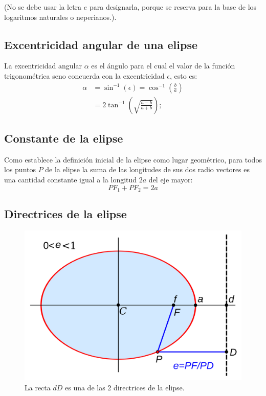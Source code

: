 \documentclass[a2,plainboxedsections]{sciposter}
\begin{document}
\begin{multicols}{3}
(No se debe usar la letra $e$ para designarla, porque se reserva para la base de los logaritmos naturales o neperianos.).

\subsection{Excentricidad angular de una elipse}

La excentricidad angular $\alpha$ es el ángulo para el cual el valor de la función trigonométrica seno concuerda con la excentricidad $\epsilon$, esto es:
\begin{align*}
\alpha&=\sin^{-1}(\epsilon)=\cos^{-1}\left(\frac{b}{a}\right)\\
&=2\tan^{-1}\left(\sqrt{\frac{a-b}{a+b}}\right);
\end{align*}

\subsection{Constante de la elipse}

Como establece la definición inicial de la elipse como lugar geométrico, para todos los puntos $P$ de la elipse la suma de las longitudes de sus dos radio vectores es una cantidad constante igual a la longitud $2a$ del eje mayor:
\[
PF_1 + PF_2 = 2a
\]

\subsection{Directrices de la elipse}

\begin{figure}
 	\includegraphics[width=\textwidth]{elipse2}
	\caption{La recta $dD$ es una de las 2 directrices de la elipse.}\label{figura2}
\end{figure}


\end{multicols}
\end{document}
